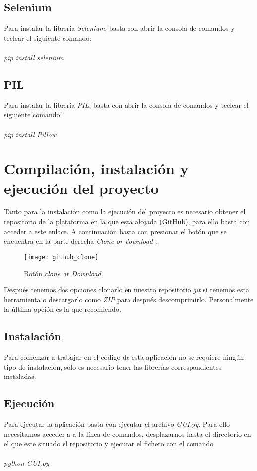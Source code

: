 \subsection{Selenium}
Para instalar la librería \emph{Selenium}, basta con abrir la consola de comandos y teclear el siguiente comando:\\ \\
\emph{pip install selenium}

\subsection{PIL}
Para instalar la librería \emph{PIL}, basta con abrir la consola de comandos y teclear el siguiente comando:\\ \\
\emph{pip install Pillow}
\section{Compilación, instalación y ejecución del proyecto}
Tanto para la instalación como la ejecución del proyecto es necesario obtener el repositorio de la plataforma en la que esta alojada (GitHub), para ello basta con acceder a este enlace\cite{github}. A continuación basta con presionar el botón que se encuentra en la parte derecha \emph{Clone or download} :
\begin{figure}[H]
	\centering
	\texttt{[image: github\_clone]}
	\caption{Botón \emph{clone or Download}}
	\label{fig:clone}
\end{figure}
Después tenemos dos opciones clonarlo en nuestro repositorio \emph{git} si tenemos esta herramienta o descargarlo como \emph{ZIP} para después descomprimirlo. Personalmente la última opción es la que recomiendo.
\subsection{Instalación}
Para comenzar a trabajar en el código de esta aplicación no se requiere ningún tipo de instalación, solo es necesario tener las librerías correspondientes instaladas.
\subsection{Ejecución}\label{ejecutar}
Para ejecutar la aplicación basta con ejecutar el archivo \emph{GUI.py}. Para ello necesitamos acceder a a la línea de comandos, desplazarnos hasta el directorio en el que este situado el repositorio y ejecutar el fichero con el comando\\ \\
\emph{python GUI.py}

